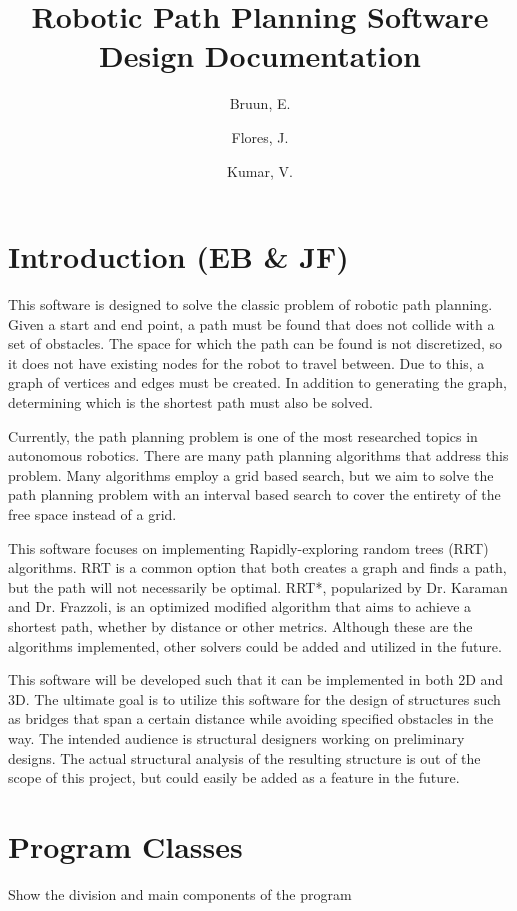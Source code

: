 \documentclass[10pt]{article}
\title{Robotic Path Planning Software Design Documentation}
\author{Bruun, E. \and Flores, J. \and Kumar, V.}
\begin{document}
\maketitle

\section{Introduction (EB \& JF)}
This software is designed to solve the classic problem of robotic path planning. Given a start and end point, a path must be found that does not collide with a set of obstacles. The space for which the path can be found is not discretized, so it does not have existing nodes for the robot to travel between. Due to this, a graph of vertices and edges must be created. In addition to generating the graph, determining which is the shortest path must also be solved. 

Currently, the path planning problem is one of the most researched topics in autonomous robotics. There are many path planning algorithms that address this problem. Many algorithms employ a grid based search, but we aim to solve the path planning problem with an interval based search to cover the entirety of the free space instead of a grid.  

This software focuses on implementing Rapidly-exploring random trees (RRT) algorithms. RRT is a common option that both creates a graph and finds a path, but the path will not necessarily be optimal. RRT*, popularized by Dr. Karaman and Dr. Frazzoli, is an optimized modified algorithm that aims to achieve a shortest path, whether by distance or other metrics. Although these are the algorithms implemented, other solvers could be added and utilized in the future.

This software will be developed such that it can be implemented in both 2D and 3D. The ultimate goal is to utilize this software for the design of structures such as bridges that span a certain distance while avoiding specified obstacles in the way. The intended audience is structural designers working on preliminary designs. The actual structural analysis of the resulting structure is out of the scope of this project, but could easily be added as a feature in the future. 

\newpage
\section{Program Classes}
Show the division and main components of the program
\end{document}
